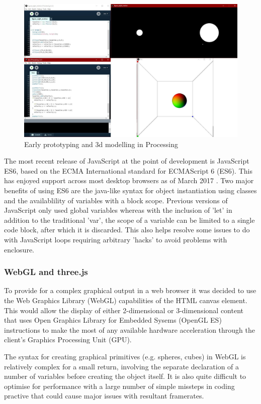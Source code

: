 \documentclass[twoside]{bhamthesis}
\begin{document}
\begin{figure}[h!]
  \includegraphics[width=\linewidth]{images/early_proto.jpg}
  \caption{Early prototyping and 3d modelling in Processing}
  \label{fig:early_proto}
\end{figure}

The most recent release of JavaScript at the point of development is JavaScript ES6, based on the ECMA International standard for ECMAScript 6 (ES6). This has enjoyed support across most desktop browsers as of March 2017 \cite{zaytsev_ecmascript_2017}. Two major benefits of using ES6 are the java-like syntax for object instantiation using classes and the availablility of variables with a block scope. Previous versions of JavaScript only used global variables whereas with the inclusion of 'let' in addition to the traditional 'var', the scope of a variable can be limited to a single code block, after which it is discarded. This also helps resolve some issues to do with JavaScript loops requiring arbitrary 'hacks' to avoid problems with enclosure.


\subsubsection{WebGL and three.js}
To provide for a complex graphical output in a web browser it was decided to use the Web Graphics Library (WebGL) capabilities of the HTML canvas element. This would allow the display of either 2-dimensional or 3-dimensional content that uses Open Graphics Library for Embedded Sysems (OpenGL ES) instructions to make the most of any available hardware acceleration through the client's Graphics Processing Unit (GPU).

The syntax for creating graphical primitives (e.g. spheres, cubes) in WebGL is relatively complex for a small return, involving the separate declaration of a number of variables before creating the object itself. It is also quite difficult to optimise for performance with a large number of simple missteps in coding practive that could cause major issues with resultant framerates.
\end{document}
